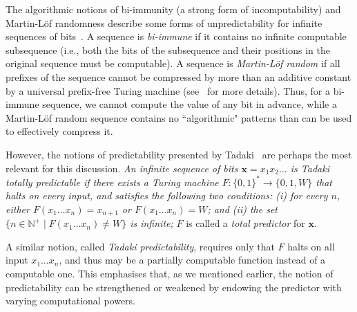 \documentclass[%
 superscriptaddress,
 preprint,
 showpacs,
 showkeys,
 preprintnumbers,
 nofootinbib,
  amsmath,amssymb,
  aps,
 pra,
  longbibliography,
  floatfix,
 ]{revtex4-1}
\theoremstyle{definition}
\newcommand{\N}{\mathbb{N}}%
\newcommand{\x}{\mathbf{x}}
\begin{document}
The algorithmic notions of bi-immunity (a strong form of incomputability) and Martin-L\"of randomness describe some forms of unpredictability for infinite sequences of bits~\cite{calude:02}.
A sequence is \emph{bi-immune} if it contains no infinite computable subsequence (i.e., both the bits of the subsequence and their positions in the original sequence must be computable).
A sequence is  \emph{Martin-L\"of random} if 
all prefixes %
of the sequence cannot be compressed by more than an additive constant  by a universal prefix-free Turing machine (see~\cite{calude:02,DH} for more details).
Thus, for a bi-immune sequence, we cannot compute the value of any bit in advance, while a Martin-L\"of random sequence contains no ``algorithmic" patterns than can be used to effectively compress it.

However, the notions of predictability presented by Tadaki~\cite{Tadaki14} are perhaps the most relevant for this discussion.
\textit{An infinite sequence of bits $\x=x_1x_2\dots$ is \emph{Tadaki totally predictable} if there exists a Turing machine $F:\{0,1\}^*\to\{0,1,W\}$ that halts on every input, and satisfies the following two conditions: (i) for every $n$, either $F(x_1\dots x_n)=x_{n+1}$ or $F(x_1\dots x_n)=W$; and (ii) the set $\{n\in \N^+ \mid F(x_1\dots x_n)\neq W\}$ is infinite;} $F$ is called a \emph{total predictor} for $\x$.

A similar notion, called \emph{Tadaki predictability}, requires only that $F$ halts on all input $x_1\dots x_n$, and thus may be a partially computable function instead of a computable one.
This emphasises that, as we mentioned earlier, the notion of predictability can be strengthened or weakened by endowing the predictor with varying computational powers.
\end{document}
